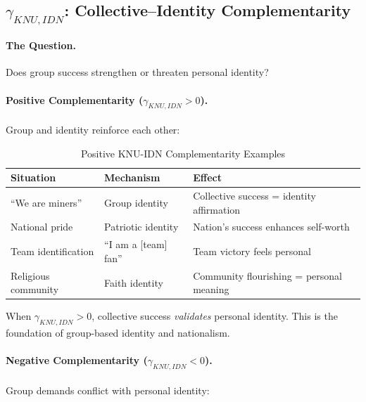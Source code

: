 \subsection{$\gamma_{KNU,IDN}$: Collective--Identity Complementarity}

\paragraph{The Question.}
Does group success strengthen or threaten personal identity?

\paragraph{Positive Complementarity ($\gamma_{KNU,IDN} > 0$).}
Group and identity reinforce each other:

\begin{table}[htbp]
\centering
\caption{Positive KNU-IDN Complementarity Examples}
\label{tab:app-c-knu-idn-positive}
\renewcommand{\arraystretch}{1.3}
\begin{tabular}{@{}lll@{}}
\toprule
\textbf{Situation} & \textbf{Mechanism} & \textbf{Effect} \\
\midrule
``We are miners'' & Group identity & Collective success = identity affirmation \\
National pride & Patriotic identity & Nation's success enhances self-worth \\
Team identification & ``I am a [team] fan'' & Team victory feels personal \\
Religious community & Faith identity & Community flourishing = personal meaning \\
\bottomrule
\end{tabular}
\end{table}

When $\gamma_{KNU,IDN} > 0$, collective success \emph{validates} personal identity.
This is the foundation of group-based identity and nationalism.

\paragraph{Negative Complementarity ($\gamma_{KNU,IDN} < 0$).}
Group demands conflict with personal identity:

